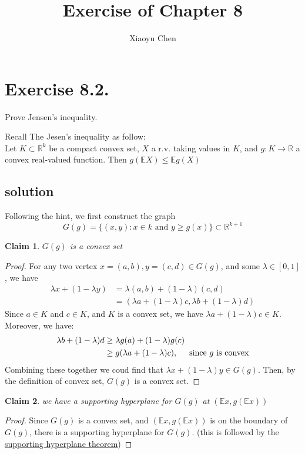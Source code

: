 \documentclass{article}
\title{Exercise of Chapter 8}
\author{Xiaoyu Chen}
\newtheorem{claim}{Claim}
\begin{document}
\maketitle
\section{Exercise 8.2.}
Prove Jensen's inequality.

\flushleft Recall The Jesen's inequality as follow: \\
Let $K\subset \mathbb{R}^k$ be a compact convex set, $X$ a r.v. taking values in $K$,
and $g: K\to \mathbb{R}$ a convex real-valued function. Then $g(\mathbb{E} X) \leq \mathbb{E} g(X)$
\subsection{solution}
Following the hint, we first construct the graph
\[G(g) = \{(x, y) : \mbox{$x\in k$ and $y\geq g(x)$}\} \subset \mathbb{R}^{k+1}\]
\begin{claim}
  $G(g)$ is a convex set
\end{claim}
\begin{proof}
For any two vertex $x = (a, b), y = (c, d) \in G(g)$, and some $\lambda \in [0, 1]$, we have
\begin{align*}
  \lambda x + (1-\lambda y) &= \lambda(a, b) + (1-\lambda)(c,d) \\
  &= (\lambda a + (1-\lambda)c, \lambda b + (1-\lambda) d)
\end{align*}
Since $a\in K$ and $c\in K$, and $K$ is a convex set, we have $\lambda a + (1-\lambda) c \in K$.
Moreover, we have:
\begin{align*}
  \lambda b + (1-\lambda) d &\geq \lambda g(a) + (1-\lambda) g(c) \\
  &\geq g(\lambda a + (1-\lambda) c),\hspace{0.5cm} \mbox{since $g$ is convex}
\end{align*}
Combining these together we coud find that $\lambda x + (1-\lambda) y \in G(g)$.
Then, by the definition of convex set, $G(g)$ is a convex set.
\end{proof}
\begin{claim}
  we have a supporting hyperplane for $G(g)$ at $(\mathbb{E} x, g(\mathbb{E} x))$
\end{claim}
\begin{proof}
  Since $G(g)$ is a convex set, and $(\mathbb{E} x, g(\mathbb{E} x))$ is on the boundary of $G(g)$, there is a supporting hyperplane for $G(g)$.
  (this is followed by the
  \href{https://en.wikipedia.org/wiki/Supporting_hyperplane}
       {supporting hyperplane theorem})
\end{proof}
\end{document}
